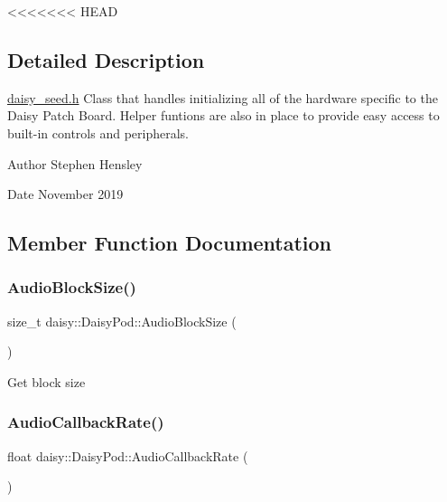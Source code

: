 <<<<<<< HEAD
\subsection{Detailed Description}
\hyperlink{daisy__seed_8h_source}{daisy\+\_\+seed.\+h} Class that handles initializing all of the hardware specific to the Daisy Patch Board. Helper funtions are also in place to provide easy access to built-\/in controls and peripherals. \begin{DoxyAuthor}{Author}
Stephen Hensley 
\end{DoxyAuthor}
\begin{DoxyDate}{Date}
November 2019 
\end{DoxyDate}


\subsection{Member Function Documentation}
\mbox{\label{classdaisy_1_1_daisy_pod_a25c3695cb0ef36eb6c64fc4fdeaf2d07}} 
\subsubsection{\texorpdfstring{Audio\+Block\+Size()}{AudioBlockSize()}}
{\footnotesize\ttfamily size\+\_\+t daisy\+::\+Daisy\+Pod\+::\+Audio\+Block\+Size (\begin{DoxyParamCaption}{ }\end{DoxyParamCaption})}

Get block size \mbox{\label{classdaisy_1_1_daisy_pod_aa31d4e642c9b46a23927cd3cc2d8cec7}} 
\subsubsection{\texorpdfstring{Audio\+Callback\+Rate()}{AudioCallbackRate()}}
{\footnotesize\ttfamily float daisy\+::\+Daisy\+Pod\+::\+Audio\+Callback\+Rate (\begin{DoxyParamCaption}{ }\end{DoxyParamCaption})}

